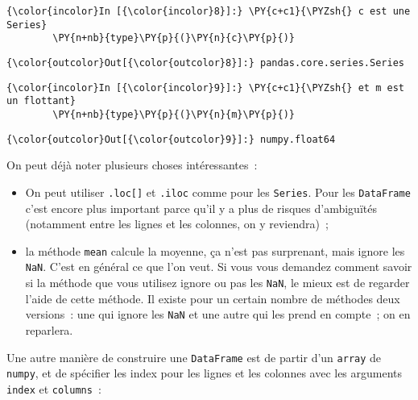     \begin{Verbatim}[commandchars=\\\{\}]
{\color{incolor}In [{\color{incolor}8}]:} \PY{c+c1}{\PYZsh{} c est une Series}
        \PY{n+nb}{type}\PY{p}{(}\PY{n}{c}\PY{p}{)}
\end{Verbatim}


\begin{Verbatim}[commandchars=\\\{\}]
{\color{outcolor}Out[{\color{outcolor}8}]:} pandas.core.series.Series
\end{Verbatim}
            
    \begin{Verbatim}[commandchars=\\\{\}]
{\color{incolor}In [{\color{incolor}9}]:} \PY{c+c1}{\PYZsh{} et m est un flottant}
        \PY{n+nb}{type}\PY{p}{(}\PY{n}{m}\PY{p}{)}
\end{Verbatim}


\begin{Verbatim}[commandchars=\\\{\}]
{\color{outcolor}Out[{\color{outcolor}9}]:} numpy.float64
\end{Verbatim}
            
    On peut déjà noter plusieurs choses intéressantes~:

\begin{itemize}
\item
  On peut utiliser \texttt{.loc{[}{]}} et \texttt{.iloc} comme pour les
  \texttt{Series}. Pour les \texttt{DataFrame} c'est encore plus
  important parce qu'il y a plus de risques d'ambiguïtés (notamment
  entre les lignes et les colonnes, on y reviendra)~;
\item
  la méthode \texttt{mean} calcule la moyenne, ça n'est pas surprenant,
  mais ignore les \texttt{NaN}. C'est en général ce que l'on veut. Si
  vous vous demandez comment savoir si la méthode que vous utilisez
  ignore ou pas les \texttt{NaN}, le mieux est de regarder l'aide de
  cette méthode. Il existe pour un certain nombre de méthodes deux
  versions~: une qui ignore les \texttt{NaN} et une autre qui les prend
  en compte~; on en reparlera.
\end{itemize}

    Une autre manière de construire une \texttt{DataFrame} est de partir
d'un \texttt{array} de \texttt{numpy}, et de spécifier les index pour
les lignes et les colonnes avec les arguments \texttt{index} et
\texttt{columns}~:

